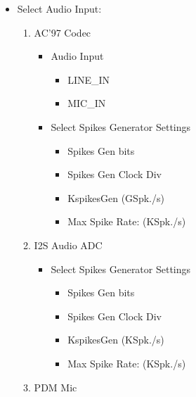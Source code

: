 \begin{itemize}
    \item Select Audio Input:
        \begin{enumerate}
            \item AC'97 Codec
                \begin{itemize}
                    \item Audio Input
                        \begin{itemize}
                            \item LINE\_IN
                            \item MIC\_IN
                        \end{itemize}
                    \item Select Spikes Generator Settings
                        \begin{itemize}
                            \item Spikes Gen bits
                            \item Spikes Gen Clock Div
                            \item KspikesGen (GSpk./s)
                            \item Max Spike Rate: (KSpk./s)
                        \end{itemize}
                \end{itemize}
            \item I2S Audio ADC
                \begin{itemize}
                    \item Select Spikes Generator Settings
                        \begin{itemize}
                            \item Spikes Gen bits
                            \item Spikes Gen Clock Div
                            \item KspikesGen (KSpk./s)
                            \item Max Spike Rate: (KSpk./s)
                        \end{itemize}
                \end{itemize}
            \item PDM Mic

\end{enumerate}
\end{itemize}
